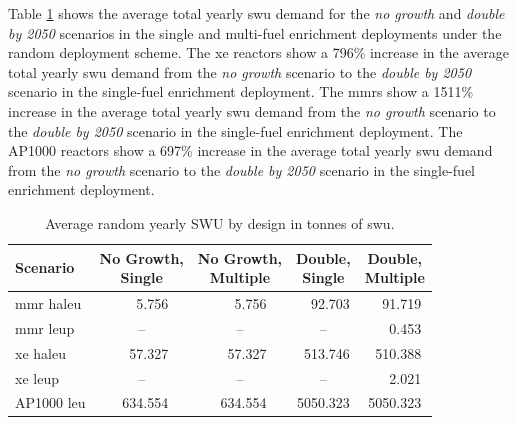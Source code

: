 Table \ref{tab:random_swu_avg} shows the average total yearly \gls{swu} demand for the \textit{no growth} and \textit{double by 2050} scenarios in the single and multi-fuel enrichment deployments under the random deployment scheme. The \gls{xe} reactors show a 796\% increase in the average total yearly \gls{swu} demand from the \textit{no growth} scenario to the \textit{double by 2050} scenario in the single-fuel enrichment deployment. The \glspl{mmr} show a 1511\% increase in the average total yearly \gls{swu} demand from the \textit{no growth} scenario to the \textit{double by 2050} scenario in the single-fuel enrichment deployment. The AP1000 reactors show a 697\% increase in the average total yearly \gls{swu} demand from the \textit{no growth} scenario to the \textit{double by 2050} scenario in the single-fuel enrichment deployment.

\begin{table}[H]
    \centering
    \caption{Average random yearly SWU by design in tonnes of \gls{swu}.}
    \label{tab:random_swu_avg}
    \begin{tabular}{l c c c c}
       \toprule
       Scenario & \shortstack{No Growth,\\ Single} & \shortstack{No Growth,\\ Multiple} & \shortstack{Double,\\ Single} & \shortstack{Double,\\ Multiple}  \\
       \midrule
       \gls{mmr} \gls{haleu}   & \textcolor{white}{000}5.756   & \textcolor{white}{000}5.756   & \textcolor{white}{00}92.703    & \textcolor{white}{00}91.719   \\
       \gls{mmr} \gls{leup}    & --      & --      & --       & \textcolor{white}{000}0.453    \\
       \gls{xe} \gls{haleu}    & \textcolor{white}{00}57.327  & \textcolor{white}{00}57.327  & \textcolor{white}{0}513.746  & \textcolor{white}{0}510.388  \\
       \gls{xe} \gls{leup}     & --      & --      & --       & \textcolor{white}{000}2.021    \\
       AP1000 \gls{leu}        & \textcolor{white}{0}634.554 & \textcolor{white}{0}634.554 & 5050.323 & 5050.323 \\
       \bottomrule
    \end{tabular}
\end{table}





